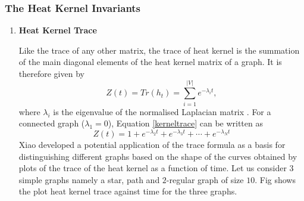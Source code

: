 \documentclass[10pt,a4paper]{article}
\begin{document}
        \subsubsection{The Heat Kernel Invariants}
        \begin{enumerate}[1]
        	\item \textbf{Heat Kernel Trace}
        	
        	Like the trace of any other matrix, the trace of heat kernel is the summation of the main diagonal elements of the heat kernel matrix of a graph. It is therefore given by
        	\begin{equation}
        	Z(t) = Tr(h_t) = \sum_{i=1}^{|V|} e^{-\lambda_i t},
        	\label{kerneltrace}
        	\end{equation}
        	where $\lambda_i$ is the eigenvalue of the normalised Laplacian matrix \cite{xiao2009graph}. 
        	For a connected graph ($\lambda_1 = 0$), Equation \ref{kerneltrace} can be written as 
        	\begin{equation}
        	Z(t) =  1+ e^{-\lambda_2 t} + e^{-\lambda_3t} + \cdots + e^{-\lambda_N t}
        	\end{equation}
        	Xiao \cite{xiao2009graph} developed a potential application of the trace formula as a basis for distinguishing different graphs based on the shape of the curves obtained by plots of the trace of the heat kernel as a function of time. Let us consider $3$ simple graphs namely a star, path and $2$-regular graph of size $10$. Fig shows the plot heat kernel trace against time for the three graphs.
        	

\end{enumerate}
\end{document}
